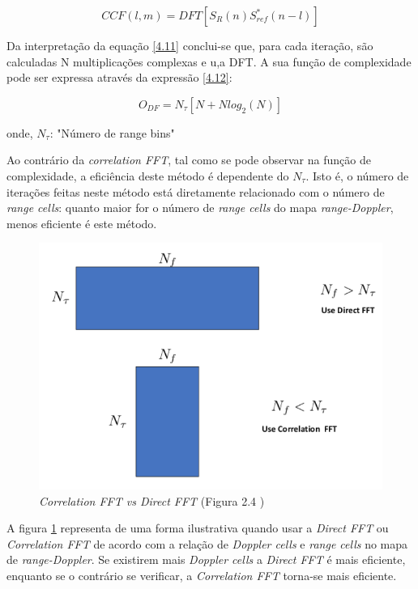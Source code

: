 \begin{equation} \label{4.11}
CCF\left(l,m\right) = DFT\left[ S_{R}\left( n\right)S_{ref}^{\ast}\left(n-l\right)\right] 
\end{equation}

Da interpretação da equação \ref{4.11} conclui-se que, para cada iteração, são calculadas N multiplicações complexas e u,a \gls{DFT}. A sua função de complexidade pode ser expressa através da expressão \ref{4.12}:


\begin{equation} \label{4.12}
O_{DF}=N_{\tau}[N+Nlog_{2}(N)]
\end{equation}

onde,
$N_{\tau}$: "Número de range bins"

Ao contrário da \textit{correlation FFT}, tal como se pode observar na função de complexidade, a eficiência deste método é dependente do $N_{\tau}$. Isto é, o número de iterações feitas neste método está diretamente relacionado com o número de \textit{range cells}: quanto maior for o número de \textit{range cells} do mapa \textit{range-Doppler}, menos eficiente é este método.\par

\begin{figure}[h]
\centering
\includegraphics[scale=0.6]{chapters/ch4/assets/cfft_vs_dfft}
\caption[Correlation FFT vs Direct FFT]{\textit{Correlation FFT vs Direct FFT} (Figura 2.4 \cite{Martorella})}
\label{fig:cfft_vs_dfft}
\end{figure}

A figura \ref{fig:cfft_vs_dfft} representa de uma forma ilustrativa quando usar a \textit{Direct FFT} ou \textit{Correlation FFT} de acordo com a relação de \textit{Doppler cells} e \textit{range cells} no mapa de \textit{range-Doppler}. Se existirem mais \textit{Doppler cells} a \textit{Direct FFT} é mais eficiente, enquanto se o contrário se verificar, a \textit{Correlation FFT} torna-se mais eficiente.

